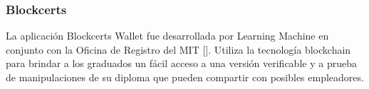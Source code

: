 
\subsubsection{Blockcerts}


La aplicación Blockcerts Wallet fue desarrollada por Learning Machine en conjunto con la Oficina de Registro del MIT [\cite{81, 79}]. Utiliza la tecnología blockchain para brindar a los graduados un fácil acceso a una versión verificable y a prueba de manipulaciones de su diploma que pueden compartir con posibles empleadores. %




